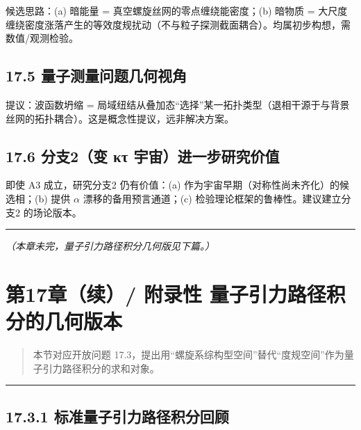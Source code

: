 候选思路：(a) 暗能量 = 真空螺旋丝网的零点缠绕能密度；(b) 暗物质 =
大尺度缠绕密度涨落产生的等效度规扰动（不与粒子探测截面耦合）。均属初步构想，需数值/观测检验。

\subsection{17.5
量子测量问题几何视角}\label{ux91cfux5b50ux6d4bux91cfux95eeux9898ux51e0ux4f55ux89c6ux89d2}

提议：波函数坍缩 =
局域纽结从叠加态``选择''某一拓扑类型（退相干源于与背景丝网的拓扑耦合）。这是概念性提议，远非解决方案。

\subsection{17.6 分支2（变 κτ
宇宙）进一步研究价值}\label{ux5206ux652f2ux53d8-ux3baux3c4-ux5b87ux5b99ux8fdbux4e00ux6b65ux7814ux7a76ux4ef7ux503c}

即使 A3 成立，研究分支2 仍有价值：(a)
作为宇宙早期（对称性尚未齐化）的候选相；(b) 提供 \(\alpha\)
漂移的备用预言通道；(c) 检验理论框架的鲁棒性。建议建立分支2 的场论版本。

\begin{center}\rule{0.5\linewidth}{0.5pt}\end{center}

\emph{（本章未完，量子引力路径积分几何版见下篇。）}

\section{第17章（续）/ 附录性
量子引力路径积分的几何版本}\label{ux7b2c17ux7ae0ux7eed-ux9644ux5f55ux6027-ux91cfux5b50ux5f15ux529bux8defux5f84ux79efux5206ux7684ux51e0ux4f55ux7248ux672c}

\begin{quote}
本节对应开放问题
17.3，提出用``螺旋系综构型空间''替代``度规空间''作为量子引力路径积分的求和对象。
\end{quote}

\begin{center}\rule{0.5\linewidth}{0.5pt}\end{center}

\subsection{17.3.1
标准量子引力路径积分回顾}\label{ux6807ux51c6ux91cfux5b50ux5f15ux529bux8defux5f84ux79efux5206ux56deux987e}

